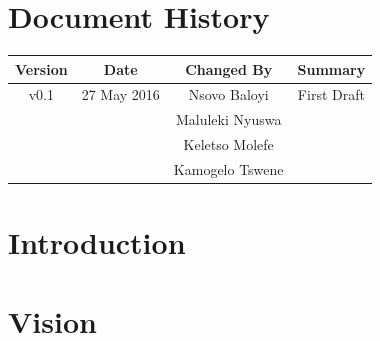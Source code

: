 \documentclass[a4paper,12pt]{article}
\begin{document}
	\newpage
	
	\tableofcontents
	\newpage
	\section*{Document History}
	
	\begin{table}[h!]
		
		\centering %
		\begin{tabular}{c c c c} %
			\hline\hline %
			Version & Date & Changed By & Summary \\ [0.5ex] %
			\hline %
			v0.1 & 27 May 2016 & Nsovo Baloyi & First Draft 
			\\ & & Maluleki Nyuswa &  
			\\ & & Keletso Molefe &
			\\ & & Kamogelo Tswene & \\ [1ex] 
			\hline
		\end{tabular}
		\label{table:nonlin} %
	\end{table}

	\newpage
	
	\section{Introduction}	
	
	
	\section{Vision}
		
	
	
\end{document}
